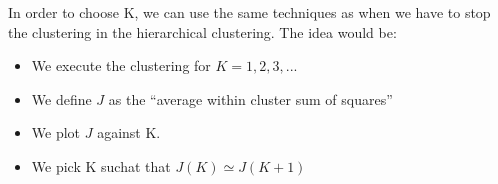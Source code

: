 In order to choose K, we can use the same techniques as when we have to stop the clustering in the hierarchical clustering. The idea would be:
\begin{itemize}
 \item We execute the clustering for $K=1,2,3,...$
 \item We define $J$ as the ``average within cluster sum of squares''
 \item We plot $J$ against K.
 \item We pick K suchat that $J(K) \simeq J(K+1)$
\end{itemize}
